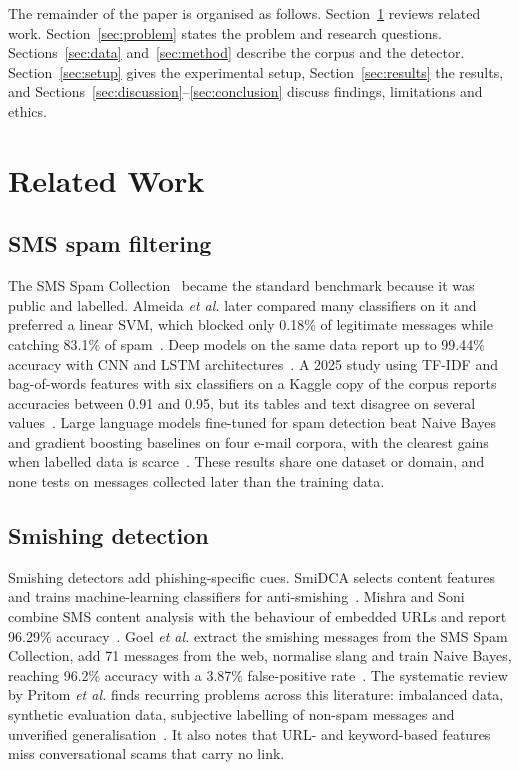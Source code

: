 \documentclass[conference]{IEEEtran}
\begin{document}
The remainder of the paper is organised as follows. Section~\ref{sec:related} reviews related work. Section~\ref{sec:problem} states the problem and research questions. Sections~\ref{sec:data} and~\ref{sec:method} describe the corpus and the detector. Section~\ref{sec:setup} gives the experimental setup, Section~\ref{sec:results} the results, and Sections~\ref{sec:discussion}--\ref{sec:conclusion} discuss findings, limitations and ethics.

\section{Related Work}
\label{sec:related}

\subsection{SMS spam filtering}
The SMS Spam Collection~\cite{almeida2011contributions} became the standard benchmark because it was public and labelled. Almeida \textit{et al.} later compared many classifiers on it and preferred a linear SVM, which blocked only 0.18\% of legitimate messages while catching 83.1\% of spam~\cite{almeida2013towards}. Deep models on the same data report up to 99.44\% accuracy with CNN and LSTM architectures~\cite{roy2020deep}. A 2025 study using TF-IDF and bag-of-words features with six classifiers on a Kaggle copy of the corpus reports accuracies between 0.91 and 0.95, but its tables and text disagree on several values~\cite{ahmadi2025llm}. Large language models fine-tuned for spam detection beat Naive Bayes and gradient boosting baselines on four e-mail corpora, with the clearest gains when labelled data is scarce~\cite{labonne2023spamt5}. These results share one dataset or domain, and none tests on messages collected later than the training data.

\subsection{Smishing detection}
Smishing detectors add phishing-specific cues. SmiDCA selects content features and trains machine-learning classifiers for anti-smishing~\cite{sonowal2018smidca}. Mishra and Soni combine SMS content analysis with the behaviour of embedded URLs and report 96.29\% accuracy~\cite{mishra2020smishing}. Goel \textit{et al.} extract the smishing messages from the SMS Spam Collection, add 71 messages from the web, normalise slang and train Naive Bayes, reaching 96.2\% accuracy with a 3.87\% false-positive rate~\cite{goel2024ml}. The systematic review by Pritom \textit{et al.} finds recurring problems across this literature: imbalanced data, synthetic evaluation data, subjective labelling of non-spam messages and unverified generalisation~\cite{pritom2026sms}. It also notes that URL- and keyword-based features miss conversational scams that carry no link.
\end{document}
